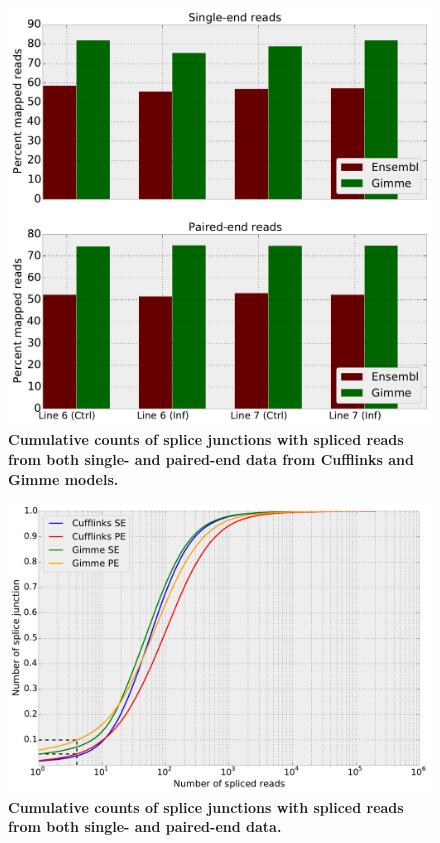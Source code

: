 \documentclass[10pt]{article}
\begin{document}
\begin{figure}[!ht]
\begin{center}
\includegraphics[width=5in]{mapped-reads.pdf}
\end{center}
\caption{
{\bf Cumulative counts of splice junctions with spliced reads from both single-
and paired-end data from Cufflinks and Gimme models.}
}
\label{mapped-reads}
\end{figure}

\begin{figure}[!ht]
\begin{center}
\includegraphics[width=5in]{cdf_splice.pdf}
\end{center}
\caption{
{\bf Cumulative counts of splice junctions with spliced reads from both single-
and paired-end data.}
}
\label{cdf_splice}
\end{figure}
\end{document}
